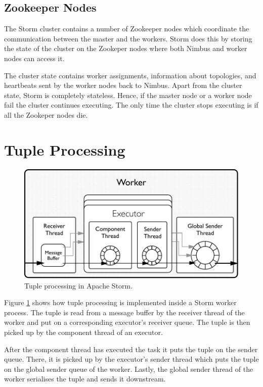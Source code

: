 \documentclass[bsc,logo,frontabs,twoside,singlespacing,normalheadings,parskip]{infthesis}     %
\begin{document}
\subsection{Zookeeper Nodes}

The Storm cluster contains a number of Zookeeper nodes which coordinate the communication between the master and the workers. Storm does this by storing the state of the cluster on the Zookeper nodes where both Nimbus and worker nodes can access it.

The cluster state contains worker assignments, information about topologies, and heartbeats sent by the worker nodes back to Nimbus. Apart from the cluster state, Storm is completely stateless. Hence, if the master node or a worker node fail the cluster continues executing. The only time the cluster stops executing is if all the Zookeper nodes die.

\section{Tuple Processing}
\label{sec:tuple_processing}

\begin{figure}[!htb]
	\centering
	\includegraphics[scale=0.7]{pdf/worker_inside.pdf}
	\caption{Tuple processing in Apache Storm.}
	\label{fig:worker_inside}
\end{figure}

Figure \ref{fig:worker_inside} shows how tuple processing is implemented inside a Storm worker process. The tuple is read from a message buffer by the receiver thread of the worker and put on a corresponding executor's receiver queue. The tuple is then picked up by the component thread of an executor.

After the component thread has executed the task it puts the tuple on the sender queue. There, it is picked up by the executor's sender thread which puts the tuple on the global sender queue of the worker. Lastly, the global sender thread of the worker serialises the tuple and sends it downstream.
\end{document}
